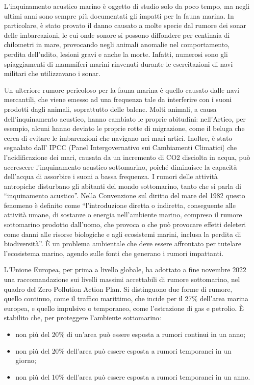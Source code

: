 L’inquinamento acustico marino è oggetto di studio solo da poco tempo, ma negli ultimi anni sono sempre più documentati gli impatti per la fauna marina. 
In particolare, è stato provato il danno causato a molte specie dal rumore dei sonar delle imbarcazioni, le cui onde sonore si possono diffondere per centinaia di chilometri in mare, provocando negli animali anomalie nel comportamento, perdita dell’udito, lesioni gravi e anche la morte. Infatti, numerosi sono gli spiaggiamenti di mammiferi marini rinvenuti durante le esercitazioni di navi militari che utilizzavano i sonar.

Un ulteriore rumore pericoloso per la fauna marina è quello causato dalle navi mercantili, che viene emesso ad una frequenza tale da interferire con i suoni prodotti dagli animali, soprattutto delle balene. 
Molti animali, a causa dell’inquinamento acustico, hanno cambiato le proprie abitudini: nell’Artico, per esempio, alcuni hanno deviato le proprie rotte di migrazione, come il beluga che cerca di evitare le imbarcazioni che navigano nei mari artici. 
Inoltre, è stato segnalato dall’ IPCC (Panel Intergovernativo sui Cambiamenti Climatici) che l’acidificazione dei mari, causata da un incremento di CO2 disciolta in acqua, può accrescere l’inquinamento acustico sottomarino, poiché diminuisce la capacità dell’acqua di assorbire i suoni a bassa frequenza.
I rumori delle attività antropiche disturbano gli abitanti del mondo sottomarino, tanto che si parla di “inquinamento acustico”. 
Nella Convenzione sul diritto del mare del 1982 questo fenomeno è definito come “l’introduzione diretta o indiretta, conseguente alle attività umane, di sostanze o energia nell’ambiente marino, compreso il rumore sottomarino prodotto dall’uomo, che provoca o che può provocare effetti deleteri come danni alle risorse biologiche e agli ecosistemi marini, inclusa la perdita di biodiversità”. 
È un problema ambientale che deve essere affrontato per tutelare l’ecosistema marino, agendo sulle fonti che generano i rumori impattanti.

L’Unione Europea, per prima a livello globale, ha adottato a fine novembre 2022 una raccomandazione sui livelli massimi accettabili di rumore sottomarino, nel quadro del Zero Pollution Action Plan. Si distinguono due forme di rumore, quello continuo, come il traffico marittimo, che incide per il 27\% dell’area marina europea, e quello impulsivo o temporaneo, come l’estrazione di gas e petrolio. 
È stabilito che, per proteggere l’ambiente sottomarino:
\begin{itemize}
\item non più del 20\% di un’area può essere esposta a rumori continui in un anno;
\item non più del 20\% dell’area può essere esposta a rumori temporanei in un giorno;
\item non più del 10\% dell’area può essere esposta a rumori temporanei in un anno.
\end{itemize}

